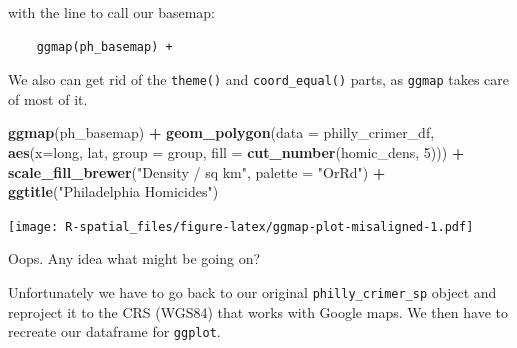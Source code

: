 \documentclass[]{book}
\newenvironment{Shaded}{\begin{snugshade}}{\end{snugshade}}
\newcommand{\KeywordTok}[1]{\textcolor[rgb]{0.13,0.29,0.53}{\textbf{#1}}}
\newcommand{\DataTypeTok}[1]{\textcolor[rgb]{0.13,0.29,0.53}{#1}}
\newcommand{\DecValTok}[1]{\textcolor[rgb]{0.00,0.00,0.81}{#1}}
\newcommand{\StringTok}[1]{\textcolor[rgb]{0.31,0.60,0.02}{#1}}
\newcommand{\OperatorTok}[1]{\textcolor[rgb]{0.81,0.36,0.00}{\textbf{#1}}}
\newcommand{\NormalTok}[1]{#1}
\theoremstyle{definition}
\theoremstyle{definition}
\theoremstyle{definition}
\theoremstyle{remark}
\begin{document}
with the line to call our basemap:

\begin{verbatim}
    ggmap(ph_basemap) +
\end{verbatim}

We also can get rid of the \texttt{theme()} and \texttt{coord\_equal()}
parts, as \texttt{ggmap} takes care of most of it.

\begin{Shaded}
\begin{Highlighting}[]
\KeywordTok{ggmap}\NormalTok{(ph_basemap) }\OperatorTok{+}
\StringTok{  }\KeywordTok{geom_polygon}\NormalTok{(}\DataTypeTok{data =}\NormalTok{ philly_crimer_df, }\KeywordTok{aes}\NormalTok{(}\DataTypeTok{x=}\NormalTok{long, lat, }\DataTypeTok{group =}\NormalTok{ group, }\DataTypeTok{fill =} \KeywordTok{cut_number}\NormalTok{(homic_dens, }\DecValTok{5}\NormalTok{))) }\OperatorTok{+}\StringTok{ }
\StringTok{  }\KeywordTok{scale_fill_brewer}\NormalTok{(}\StringTok{"Density / sq km"}\NormalTok{, }\DataTypeTok{palette =} \StringTok{"OrRd"}\NormalTok{) }\OperatorTok{+}\StringTok{ }
\StringTok{  }\KeywordTok{ggtitle}\NormalTok{(}\StringTok{"Philadelphia Homicides"}\NormalTok{) }
\end{Highlighting}
\end{Shaded}

\texttt{[image: R-spatial\_files/figure-latex/ggmap-plot-misaligned-1.pdf]}

Oops. Any idea what might be going on?

Unfortunately we have to go back to our original
\texttt{philly\_crimer\_sp} object and reproject it to the CRS (WGS84)
that works with Google maps. We then have to recreate our dataframe for
\texttt{ggplot}.
\end{document}
